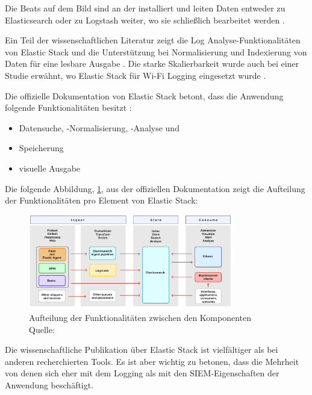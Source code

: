 Die Beats auf dem Bild sind an der  installiert und leiten Daten entweder zu Elasticsearch oder zu Logstash weiter, wo sie schließlich bearbeitet werden \citep{Jain_LMELK}. 

Ein Teil der wissenschaftlichen Literatur zeigt die Log Analyse-Funktionalitäten von Elastic Stack und die Unterstützung bei Normalisierung und Indexierung von Daten für eine lesbare Ausgabe \citep{Advani_elkstakc}. Die starke Skalierbarkeit wurde auch bei einer Studie erwähnt, wo Elastic Stack für Wi-Fi Logging eingesetzt wurde \citep{Wang_elkwifi}. 

Die offizielle Dokumentation von Elastic Stack betont, dass die Anwendung folgende Funktionalitäten besitzt \citep{elastic_docs}: 

\begin{itemize}[noitemsep]
   \item Datensuche, -Normalisierung, -Analyse und 
   \item Speicherung
   \item visuelle Ausgabe
\end{itemize}

Die folgende Abbildung, \ref{fig:ElasticKomponenten}, aus der offiziellen Dokumentation zeigt die Aufteilung der Funktionalitäten pro Element von Elastic Stack:

\begin{figure}[H]
   \centering
   \includegraphics[width=0.8\textwidth]{assets/2_p9.png}
   \caption[Aufteilung der Funktionalitäten zwischen den Komponenten]
   {Aufteilung der Funktionalitäten zwischen den Komponenten\\Quelle: \citep{elastic_docs}}
   \label{fig:ElasticKomponenten}
   \centering
\end{figure}

Die wissenschaftliche Publikation über Elastic Stack ist vielfältiger als bei anderen recherchierten Tools. Es ist aber wichtig zu betonen, dass die Mehrheit von denen sich eher mit dem Logging als mit den \gls{SIEM}-Eigenschaften der Anwendung beschäftigt.

